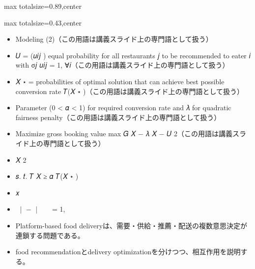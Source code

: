 \begin{minipage}[t]{0.58\textwidth}
\begin{adjustbox}{max totalsize={\textwidth}{0.89\textheight},center}
\begin{minipage}{\textwidth}
\end{minipage}
\end{adjustbox}
\end{minipage}


\clearpage
{}
\begin{minipage}[t]{0.405\textwidth}
\begin{adjustbox}{max totalsize={\textwidth}{0.43\textheight},center}
\begin{minipage}{\textwidth}\scriptsize
{}\begin{itemize}
\item Modeling (2)（この用語は講義スライド上の専門語として扱う）
\item 𝑈 = (𝑢𝑖𝑗 ) equal probability for all restaurants 𝑗 to be recommended to eater 𝑖 with σ𝑗 𝑢𝑖𝑗 = 1, ∀𝑖（この用語は講義スライド上の専門語として扱う）
\item 𝑋 ⋆ = probabilities of optimal solution that can achieve best possible conversion rate 𝑇(𝑋 ⋆ )（この用語は講義スライド上の専門語として扱う）
\item Parameter (0 < 𝛼 < 1) for required conversion rate and 𝜆 for quadratic fairness penalty（この用語は講義スライド上の専門語として扱う）
\item Maximize gross booking value max 𝐺 𝑋 − 𝜆 𝑋 − 𝑈 2（この用語は講義スライド上の専門語として扱う）
\item 𝑋 2
\item 𝑠. 𝑡. 𝑇 𝑋 ≥ 𝛼 𝑇(𝑋 ⋆ )
\item 𝑥
\item 𝑢 |𝑥 − 𝑢| ෍ 𝑥𝑖𝑗 = 1, ∀𝑖
\end{itemize}\begin{itemize}
\item Platform-based food deliveryは、需要・供給・推薦・配送の複数意思決定が連鎖する問題である。
\item food recommendationとdelivery optimizationを分けつつ、相互作用を説明する。
\end{itemize}
\end{minipage}
\end{adjustbox}
\end{minipage}\hfill
